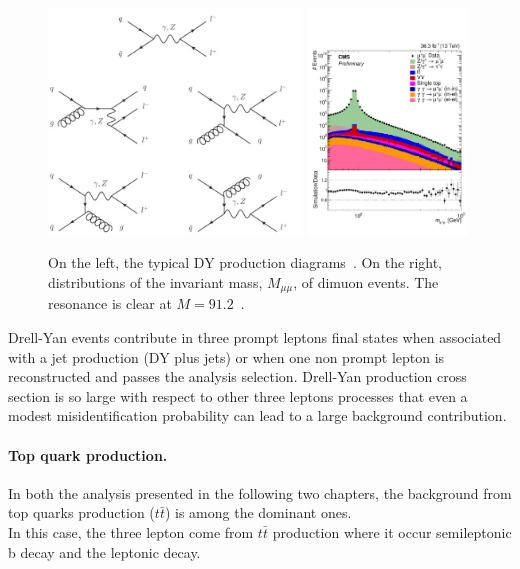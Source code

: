 \begin{figure}[h!]
\centering
  \includegraphics[height =
  6cm]{Figures/c4/dia/The-Feynman-graphs-for-Drell-Yan-pair-production-at-the-Oa-and-Oaa-s-orders_W640.jpeg}
\hspace{1cm}
  \includegraphics[height = 6cm]{Figures/c4/dia/Figure_001-a.pdf}
  \caption{On the left, the typical DY production
    diagrams~\cite{diagram}. On the right, distributions of the
    invariant mass, $M_{\mu \mu}$, of dimuon events. The \PZ resonance
    is clear at $M=91.2$\GeV~\cite{CMS-PAS-SMP-20-003}.}
  \label{fig:c44}
\end{figure}
Drell-Yan events contribute in three prompt leptons final states when
associated with a jet production (DY plus jets) or when one non prompt
lepton is reconstructed and passes the analysis selection. Drell-Yan
production cross section is so large with respect to other three
leptons processes that even a modest misidentification probability can
lead to a large background contribution.

\paragraph{Top quark production.}\label{sec:c4ttbar}
In both the analysis presented in the following two chapters, the
background from top quarks production ($t\bar{t}$) is among the
dominant ones. \\
In this case, the three lepton come from $t\bar{t}$ production where
it occur semileptonic b decay and the leptonic \PW decay.

